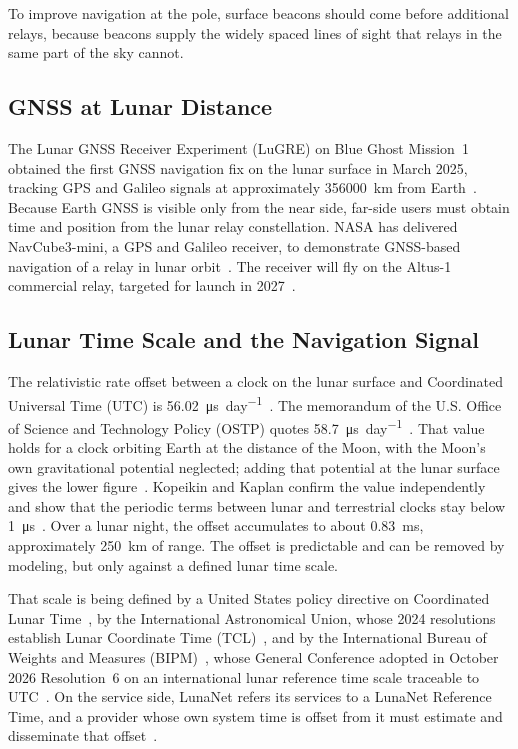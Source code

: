 \documentclass{IEEEoj}
\begin{document}
\begin{remark}
To improve navigation at the pole, surface beacons should come before additional relays, because beacons supply the widely spaced lines of sight that relays in the same part of the sky cannot.
\end{remark}

\subsection{GNSS at Lunar Distance}
\label{sec:gnss}
The Lunar GNSS Receiver Experiment (LuGRE) on Blue Ghost Mission~1 obtained the first GNSS navigation fix on the lunar surface in March 2025, tracking GPS and Galileo signals at approximately \SI{356000}{km} from Earth~\cite{parker_lugre,nasa_lugre}. Because Earth GNSS is visible only from the near side, far-side users must obtain time and position from the lunar relay constellation. NASA has delivered NavCube3-mini, a GPS and Galileo receiver, to demonstrate GNSS-based navigation of a relay in lunar orbit~\cite{nasa_navcube3_2026}. The receiver will fly on the Altus-1 commercial relay, targeted for launch in 2027~\cite{mina2026altus}.

\subsection{Lunar Time Scale and the Navigation Signal}
\label{sec:timescale}
The relativistic rate offset between a clock on the lunar surface and Coordinated Universal Time (UTC) is \SI{56.02}{\micro\second\per day}~\cite{ashby_lunar_time}. The memorandum of the U.S. Office of Science and Technology Policy (OSTP) quotes \SI{58.7}{\micro\second\per day}~\cite{ostp_ltc}. That value holds for a clock orbiting Earth at the distance of the Moon, with the Moon's own gravitational potential neglected; adding that potential at the lunar surface gives the lower figure~\cite{ashby_lunar_time}. Kopeikin and Kaplan confirm the value independently and show that the periodic terms between lunar and terrestrial clocks stay below \SI{1}{\micro\second}~\cite{kopeikin_kaplan}. Over a lunar night, the offset accumulates to about \SI{0.83}{ms}, approximately \SI{250}{km} of range. The offset is predictable and can be removed by modeling, but only against a defined lunar time scale.

That scale is being defined by a United States policy directive on Coordinated Lunar Time~\cite{ostp_ltc}, by the International Astronomical Union, whose 2024 resolutions establish Lunar Coordinate Time (TCL)~\cite{iau_2024_resolutions}, and by the International Bureau of Weights and Measures (BIPM)~\cite{bipm_cctf24_1}, whose General Conference adopted in October 2026 Resolution~6 on an international lunar reference time scale traceable to UTC~\cite{bipm_cgpm2026_res6}. On the service side, LunaNet refers its services to a LunaNet Reference Time, and a provider whose own system time is offset from it must estimate and disseminate that offset~\cite{lnis_v5}.
\end{document}
